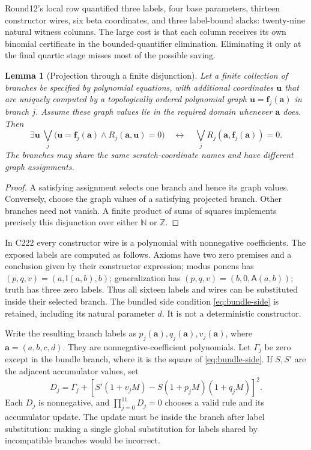\documentclass[11pt,a4paper]{article}
\newtheorem{lemma}[theorem]{Lemma}
\theoremstyle{definition}\newtheorem{definition}[theorem]{Definition}
\theoremstyle{remark}\newtheorem{remark}[theorem]{Remark}
\newcommand{\N}{\mathbb N}\newcommand{\Z}{\mathbb Z}\newcommand{\Q}{\mathbb Q}
\newcommand{\Imp}{\mathsf I}\newcommand{\Rel}{\mathsf R}\newcommand{\All}{\mathsf A}
\numberwithin{equation}{section}
\begin{document}
Round12's local row quantified three labels, four base parameters,
thirteen constructor wires, six beta coordinates, and three label-bound
slacks: twenty-nine natural witness columns. The large cost is that each
column receives its own binomial certificate in the bounded-quantifier
elimination. Eliminating it only at the final quartic stage misses most
of the possible saving.

\begin{lemma}[Projection through a finite disjunction]
Let a finite collection of branches be specified by polynomial equations,
with additional coordinates \(\boldsymbol u\) that are uniquely computed
by a topologically ordered polynomial graph
\(\boldsymbol u=\boldsymbol f_j(\boldsymbol a)\) in branch \(j\).
Assume these graph values lie in the required domain whenever
\(\boldsymbol a\) does. Then
\[
 \exists\boldsymbol u\ \bigvee_j
  \bigl(\boldsymbol u=\boldsymbol f_j(\boldsymbol a)
              \land R_j(\boldsymbol a,\boldsymbol u)=0\bigr)
 \quad\longleftrightarrow\quad
 \bigvee_j R_j(\boldsymbol a,\boldsymbol f_j(\boldsymbol a))=0.
\]
The branches may share the same scratch-coordinate names and have
different graph assignments.
\end{lemma}
\begin{proof}
A satisfying assignment selects one branch and hence its graph values.
Conversely, choose the graph values of a satisfying projected branch.
Other branches need not vanish. A finite product of sums of squares
implements precisely this disjunction over either \(\N\) or \(\Z\).
\end{proof}

In C222 every constructor wire is a polynomial with nonnegative
coefficients. The exposed labels are computed as follows. Axioms have
two zero premises and a conclusion given by their constructor expression;
modus ponens has \((p,q,v)=(a,\Imp(a,b),b)\); generalization has
\((p,q,v)=(b,0,\All(a,b))\); truth has three zero labels. Thus all
sixteen labels and wires can be substituted inside their selected branch.
The bundled side condition \eqref{eq:bundle-side} is retained, including
its natural parameter \(d\). It is not a deterministic constructor.

Write the resulting branch labels as
\(p_j(\boldsymbol a),q_j(\boldsymbol a),v_j(\boldsymbol a)\), where
\(\boldsymbol a=(a,b,c,d)\). They are nonnegative-coefficient
polynomials. Let \(\Gamma_j\) be zero except in the bundle branch, where
it is the square of \eqref{eq:bundle-side}. If \(S,S'\) are the adjacent
accumulator values, set
\begin{equation}
 D_j=\Gamma_j+
 \left[S'(1+v_jM)-S(1+p_jM)(1+q_jM)\right]^2.
\label{eq:branch}
\end{equation}
Each \(D_j\) is nonnegative, and \(\prod_{j=0}^{11}D_j=0\) chooses a
valid rule and its accumulator update. The update must be inside the
branch after label substitution: making a single global substitution
for labels shared by incompatible branches would be incorrect.
\end{document}
